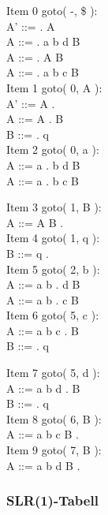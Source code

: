 \documentclass[10pt, titlepage, oneside, a4paper]{article}
\begin{document}
	\begin{multicols}{3}
Item 0	goto( -, \$ ):\\
	A' ::= . A\\
	A ::= . a b d B\\
	A ::= . A B\\
	A ::= . a b c B\\
	
Item 1	goto( 0, A ):\\
	A' ::= A .\\
	A ::= A . B\\
	B ::= . q\\
	
Item 2	goto( 0, a ):\\
	A ::= a . b d B\\
	A ::= a . b c B\\
	
\columnbreak	

Item 3	goto( 1, B ):\\
	A ::= A B .\\
	
Item 4	goto( 1, q ):\\
	B ::= q .\\
	
Item 5	goto( 2, b ):\\
	A ::= a b . d B\\
	A ::= a b . c B\\
	
Item 6	goto( 5, c ):\\
	A ::= a b c . B\\
	B ::= . q\\

\columnbreak	
	
Item 7	goto( 5, d ):\\
	A ::= a b d . B\\
	B ::= . q\\
	
Item 8	goto( 6, B ):\\
	A ::= a b c B .\\
	
Item 9	goto( 7, B ):\\
	A ::= a b d B .\\
	
\end{multicols}	

	\pagebreak
	
	
	\subsubsection{SLR(1)-Tabell}
	
\end{document}
